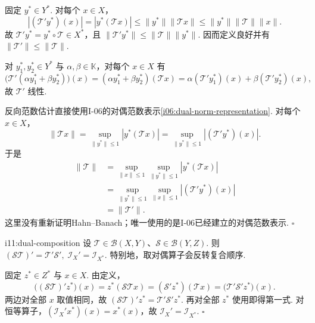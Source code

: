 \begin{FAProof}
固定 \(\displaystyle y^*\in Y^*\). 对每个 \(\displaystyle x\in X\)，
\[
|(\mathcal T'y^*)(x)|
=|y^*(\mathcal T x)|
\leqslant\|y^*\|\|\mathcal T x\|
\leqslant\|y^*\|\|\mathcal T\|\|x\|.
\]
故 \(\displaystyle \mathcal T'y^*=y^*\circ\mathcal T\in X^*\)，且 \(\displaystyle \|\mathcal T'y^*\|\leqslant\|\mathcal T\|\|y^*\|\). 因而定义良好并有 \(\displaystyle \|\mathcal T'\|\leqslant\|\mathcal T\|\).

对 \(\displaystyle y_1^*,y_2^*\in Y^*\) 与 \(\displaystyle \alpha,\beta\in\mathbb K\)，对每个 \(\displaystyle x\in X\) 有
\[
\bigl(\mathcal T'(\alpha y_1^*+\beta y_2^*)\bigr)(x)
=(\alpha y_1^*+\beta y_2^*)(\mathcal T x)
=\alpha(\mathcal T'y_1^*)(x)+\beta(\mathcal T'y_2^*)(x),
\]
故 \(\displaystyle \mathcal T'\) 线性.

反向范数估计直接使用I-06的对偶范数表示\autoref{i06:dual-norm-representation}. 对每个 \(\displaystyle x\in X\)，
\[
\|\mathcal T x\|
=
\sup_{\|y^*\|\leqslant1}|y^*(\mathcal T x)|
=
\sup_{\|y^*\|\leqslant1}|(\mathcal T'y^*)(x)|.
\]
于是
\[
\begin{aligned}
\displaystyle \|\mathcal T\|
&\displaystyle =\sup_{\|x\|\leqslant1}\sup_{\|y^*\|\leqslant1}|y^*(\mathcal T x)|\\
&\displaystyle =\sup_{\|y^*\|\leqslant1}\sup_{\|x\|\leqslant1}|(\mathcal T'y^*)(x)|\\
&\displaystyle =\|\mathcal T'\|.
\end{aligned}
\]
这里没有重新证明Hahn--Banach；唯一使用的是I-06已经建立的对偶范数表示.
\hfill\(\square\)
\end{FAProof}

\begin{FAProposition}[B][对偶算子的复合反序]{i11:dual-composition}
设 \(\displaystyle \mathcal T\in\mathcal B(X,Y)\)、\(\displaystyle \mathcal S\in\mathcal B(Y,Z)\). 则
\(\displaystyle (\mathcal S\mathcal T)'=\mathcal T'\mathcal S', \; \mathcal I_X'=\mathcal I_{X^*}\).
特别地，取对偶算子会反转复合顺序.
\end{FAProposition}

\begin{FAProof}
固定 \(\displaystyle z^*\in Z^*\) 与 \(\displaystyle x\in X\). 由定义，
\[
\bigl((\mathcal S\mathcal T)'z^*\bigr)(x) =z^*(\mathcal S\mathcal T x) =(\mathcal S'z^*)(\mathcal T x) =\bigl(\mathcal T'\mathcal S'z^*\bigr)(x).
\]
两边对全部 \(\displaystyle x\) 取值相同，故 \(\displaystyle (\mathcal S\mathcal T)'z^*=\mathcal T'\mathcal S'z^*\). 再对全部 \(\displaystyle z^*\) 使用即得第一式. 对恒等算子，\(\displaystyle (\mathcal I_X'x^*)(x)=x^*(x)\)，故 \(\displaystyle \mathcal I_X'=\mathcal I_{X^*}\).
\hfill\(\square\)
\end{FAProof}

